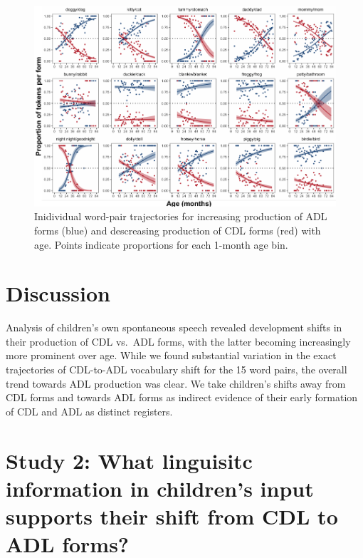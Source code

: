 \documentclass[10pt, letterpaper]{article}
\newenvironment{CodeChunk}{}{}
\begin{document}
\begin{CodeChunk}
\begin{figure}[!ht]

{\centering \includegraphics{figs/shift-timing-bypair-fig-1} 

}

\caption[Inidividual word-pair trajectories for increasing production of ADL forms (blue) and descreasing production of CDL forms (red) with age]{Inidividual word-pair trajectories for increasing production of ADL forms (blue) and descreasing production of CDL forms (red) with age. Points indicate proportions for each 1-month age bin.}\label{fig:shift-timing-bypair-fig}
\end{figure}
\end{CodeChunk}

\hypertarget{discussion}{%
\section{Discussion}\label{discussion}}

Analysis of children's own spontaneous speech revealed development
shifts in their production of CDL vs.~ADL forms, with the latter
becoming increasingly more prominent over age. While we found
substantial variation in the exact trajectories of CDL-to-ADL vocabulary
shift for the 15 word pairs, the overall trend towards ADL production
was clear. We take children's shifts away from CDL forms and towards ADL
forms as indirect evidence of their early formation of CDL and ADL as
distinct registers.

\hypertarget{study-2-what-linguisitc-information-in-childrens-input-supports-their-shift-from-cdl-to-adl-forms}{%
\section{Study 2: What linguisitc information in children's input
supports their shift from CDL to ADL
forms?}\label{study-2-what-linguisitc-information-in-childrens-input-supports-their-shift-from-cdl-to-adl-forms}}
\end{document}
